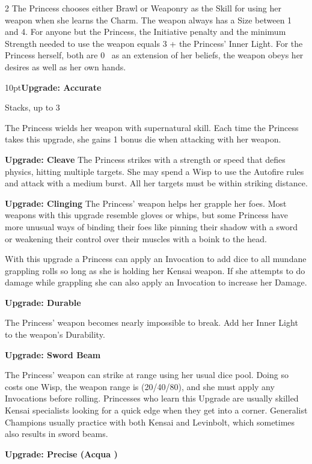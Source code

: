 \begin{multicols}{2}
The Princess chooses either Brawl or Weaponry as the Skill for using her weapon when she learns the Charm. The weapon always has a Size between 1 and 4. For anyone but the Princess, the Initiative penalty and the minimum Strength needed to use the weapon equals 3 + the Princess' Inner Light. For the Princess herself, both are 0 \textendash\, as an extension of her beliefs, the weapon obeys her desires as well as her own hands.

\begin{myindentpar}{10pt}\textbf{Upgrade: Accurate}

Stacks, up to 3

The Princess wields her weapon with supernatural skill. Each time the Princess takes this upgrade, she gains 1 bonus die when attacking with her weapon.

\textbf{Upgrade: Cleave}
The Princess strikes with a strength or speed that defies physics, hitting multiple targets. She may spend a Wisp to use the Autofire rules and attack with a medium burst. All her targets must be within striking distance. 

\textbf{Upgrade: Clinging}
The Princess' weapon helps her grapple her foes. Most weapons with this upgrade resemble gloves or whips, but some Princess have more unusual ways of binding their foes like pinning their shadow with a sword or weakening their control over their muscles with a boink to the head. 

With this upgrade a Princess can apply an Invocation to add dice to all mundane grappling rolls so long as she is holding her Kensai weapon. If she attempts to do damage while grappling she can also apply an Invocation to increase her Damage. 

\textbf{Upgrade: Durable}

The Princess' weapon becomes nearly impossible to break. Add her Inner Light to the weapon's Durability.

\textbf{Upgrade: Sword Beam}

The Princess' weapon can strike at range using her usual dice pool. Doing so costs one Wisp, the weapon range is (20/40/80), and she must apply any Invocations before rolling. Princesses who learn this Upgrade are usually skilled Kensai specialists looking for a quick edge when they get into a corner. Generalist Champions usually practice with both Kensai and Levinbolt, which sometimes also results in sword beams.

\textbf{Upgrade: Precise (Acqua \textbullet\textbullet)}


\end{myindentpar}
\end{multicols}
